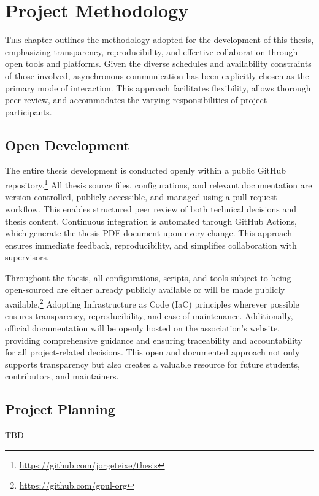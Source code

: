 %

\chapter{Project Methodology}
\label{chap:project-methodology}

\lettrine{T}{his} chapter outlines the methodology adopted for the development of this thesis, emphasizing transparency, reproducibility, and effective collaboration through open tools and platforms. Given the diverse schedules and availability constraints of those involved, asynchronous communication has been explicitly chosen as the primary mode of interaction. This approach facilitates flexibility, allows thorough peer review, and accommodates the varying responsibilities of project participants.

\section{Open Development}

The entire thesis development is conducted openly within a public GitHub repository.\footnote{\url{https://github.com/jorgeteixe/thesis}} All thesis source files, configurations, and relevant documentation are version-controlled, publicly accessible, and managed using a pull request workflow. This enables structured peer review of both technical decisions and thesis content. Continuous integration is automated through GitHub Actions, which generate the thesis PDF document upon every change. This approach ensures immediate feedback, reproducibility, and simplifies collaboration with supervisors.

Throughout the thesis, all configurations, scripts, and tools subject to being open-sourced are either already publicly available or will be made publicly available.\footnote{\url{https://github.com/gpul-org}} Adopting Infrastructure as Code (IaC) principles wherever possible ensures transparency, reproducibility, and ease of maintenance. Additionally, official documentation will be openly hosted on the association's website, providing comprehensive guidance and ensuring traceability and accountability for all project-related decisions. This open and documented approach not only supports transparency but also creates a valuable resource for future students, contributors, and maintainers.

\section{Project Planning}

TBD
